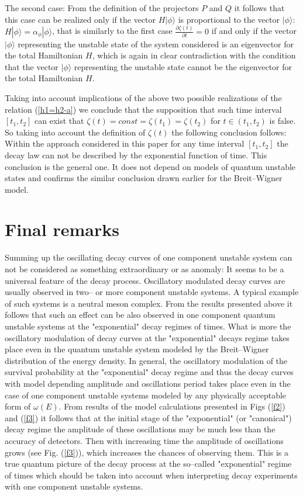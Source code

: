 \documentclass[12pt]{article}
\begin{document}
The second case: From the definition of the projectors $P$ and $Q$ it follows that this case can be realized only if the vector $H|\phi \rangle$ is proportional to the vector $|\phi\rangle$:  $H|\phi \rangle = \alpha_{\phi} |\phi\rangle$,
that is similarly to the first case $\frac{\partial \zeta (t)}{\partial t} = 0$ if and only
if the vector $|\phi\rangle$ representing the unstable state of the system considered is an eigenvector for the total Hamiltonian $H$,
which is again in clear contradiction with the condition that the vector $|\phi\rangle$ representing the  unstable state cannot be the eigenvector for the total Hamiltonian $H$.

Taking into account implications of the above two possible realizations of the relation (\ref{h1=h2-a})
we conclude that the supposition that such time interval $[t_{1},t_{2}]$ can exist that $\zeta (t) = const = \zeta(t_{1}) = \zeta(t_{2})$ for $t \in (t_{1},t_{2})$ is false. So taking into account the definition of $\zeta (t)$ the following conclusion follows:
Within the approach considered in this paper  for any time interval $[t_{1},t_{2}]$ the decay law can not be described by the exponential function of time. This conclusion is the general one. It does not depend on models of quantum unstable states and confirms the similar conclusion  drawn earlier for the Breit--Wigner model.


\section{Final remarks}
Summing up the oscillating decay curves of  one component unstable system can not be considered as something extraordinary or as anomaly: It seems to be a universal
feature of the decay process.
Oscillatory modulated decay curves are usually observed in two-- or more component unstable systems. A typical example of such systems is a neutral meson complex. From the results presented above it follows that such an effect can be also  observed in one component quantum unstable systems at the "exponential" decay regimes of times. What is more the oscillatory modulation of decay curves at the "exponential" decays regime takes place even in the quantum unstable system modeled by the Breit--Wigner distribution of the energy density.
In general,
 the oscillatory modulation of the survival probability at the "exponential" decay regime and thus the decay curves with model depending amplitude and oscillations period
takes place even in the case of one component unstable systems
modeled by  any physically acceptable form of $\omega (E)$.
From results of the model calculations presented in Figs (\ref{f2}) and (\ref{f3}) it follows that at the initial stage of the "exponential" (or "canonical") decay regime
the amplitude of these oscillations  may be much less than the accuracy of detectors. Then  with increasing time  the amplitude of oscillations grows (see Fig. (\ref{f3})), which increases the chances of observing them.
This is a true quantum picture of the decay process at the so--called "exponential" regime of times which should be taken into account when interpreting decay experiments
with one component unstable systems.
\end{document}
